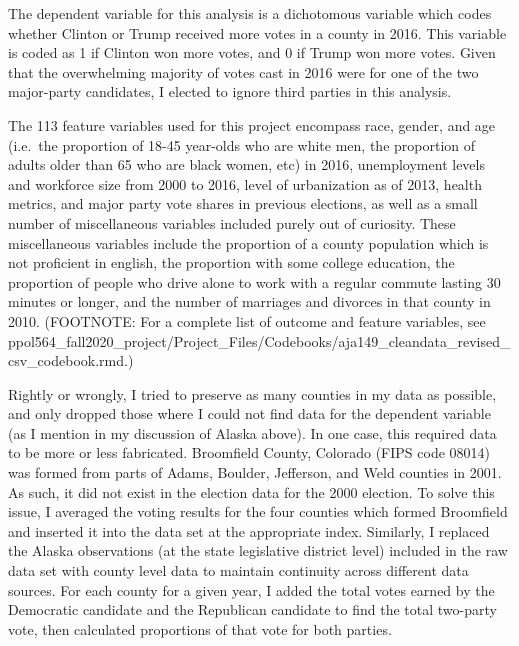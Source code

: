 \documentclass[11pt]{article}
\begin{document}
    The dependent variable for this analysis is a dichotomous variable which
codes whether Clinton or Trump received more votes in a county in 2016.
This variable is coded as 1 if Clinton won more votes, and 0 if Trump
won more votes. Given that the overwhelming majority of votes cast in
2016 were for one of the two major-party candidates, I elected to ignore
third parties in this analysis.

    The 113 feature variables used for this project encompass race, gender,
and age (i.e.~the proportion of 18-45 year-olds who are white men, the
proportion of adults older than 65 who are black women, etc) in 2016,
unemployment levels and workforce size from 2000 to 2016, level of
urbanization as of 2013, health metrics, and major party vote shares in
previous elections, as well as a small number of miscellaneous variables
included purely out of curiosity. These miscellaneous variables include
the proportion of a county population which is not proficient in
english, the proportion with some college education, the proportion of
people who drive alone to work with a regular commute lasting 30 minutes
or longer, and the number of marriages and divorces in that county in
2010. (FOOTNOTE: For a complete list of outcome and feature variables,
see
ppol564\_fall2020\_project/Project\_Files/Codebooks/aja149\_cleandata\_revised\_csv\_codebook.rmd.)

    Rightly or wrongly, I tried to preserve as many counties in my data as
possible, and only dropped those where I could not find data for the
dependent variable (as I mention in my discussion of Alaska above). In
one case, this required data to be more or less fabricated. Broomfield
County, Colorado (FIPS code 08014) was formed from parts of Adams,
Boulder, Jefferson, and Weld counties in 2001. As such, it did not exist
in the election data for the 2000 election. To solve this issue, I
averaged the voting results for the four counties which formed
Broomfield and inserted it into the data set at the appropriate index.
Similarly, I replaced the Alaska observations (at the state legislative
district level) included in the raw data set with county level data to
maintain continuity across different data sources. For each county for a
given year, I added the total votes earned by the Democratic candidate
and the Republican candidate to find the total two-party vote, then
calculated proportions of that vote for both parties.
\end{document}
